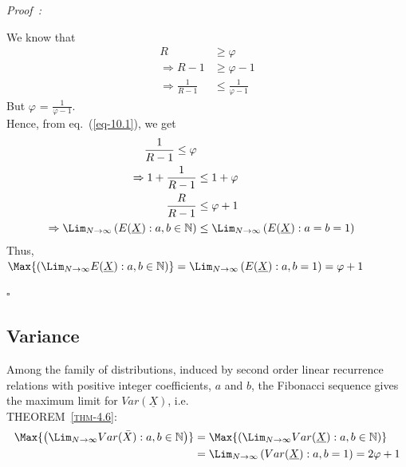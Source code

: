 \begin{multicols}{2}
\vspace{-1cm}

{\it Proof~:}

We know that 
\begin{align}
 R &\geq \varphi\nonumber\\
 \Rightarrow R-1 &\geq \varphi -1 \nonumber\\
\Rightarrow \frac{1}{R-1} &\leq \frac{1}{\varphi-1}\label{eq-10.1}
 \end{align}
 But $\varphi$ = $\displaystyle{\frac{1}{\varphi-1}}$. \\Hence, from eq.~(\ref{eq-10.1}), we get
{\fontsize{8}{9}\selectfont\begin{align}
\frac{1}{R-1} \leq \varphi\nonumber\\
\Rightarrow 1 + \frac{1}{R-1} &\leq 1+\varphi\label{eq-10.2}\\
\displaystyle{\frac{R}{R-1}} &\leq \varphi + 1 \nonumber\\
\Rightarrow \Lim_{N\rightarrow \infty}\left(E(\underline{X}):a,b\in \mathbb N\right) &\leq \Lim_{N\rightarrow \infty}\left(E(\underline{X}): a = b = 1\right)\label{eq-10.3}
\end{align}}
Thus, \\
$\Max{\left(\displaystyle{\Lim_{N\rightarrow \infty}} E(\underline{X}): a, b \in \mathbb N\right)} = \displaystyle{\Lim_{N \rightarrow \infty}}\left(E(\underline{X}) : a,b = 1\right) = \varphi + 1$

\vspace{-.3cm}

\hfill{$\square$}

\vspace{-.3cm}

\subsection{Variance}\label{subsection-10.2}

Among the family of distributions, induced by second order linear recurrence relations with positive integer coefficients, $a$ and $b$, the Fibonacci sequence gives the maximum limit for $Var(\underline{X})$, i.e.\\
\textsc{THEOREM~{\ref{thm-4.6}}:}
{\fontsize{7}{8}\selectfont\begin{align}
\Max{\left(\Lim_{N\rightarrow \infty} Var(\bar{X}): a,b \in \mathbb N\right)}&= \Max{\left(\Lim_{N\rightarrow \infty}Var(\underline{X}): a,b \in \mathbb N\right)}\label{eq-10.4}\\
 &= \Lim_{N \rightarrow \infty}\left(Var(\underline{X}):a,b=1\right) = 2\varphi + 1\label{eq-10.5}
\end{align}}


\end{multicols}
